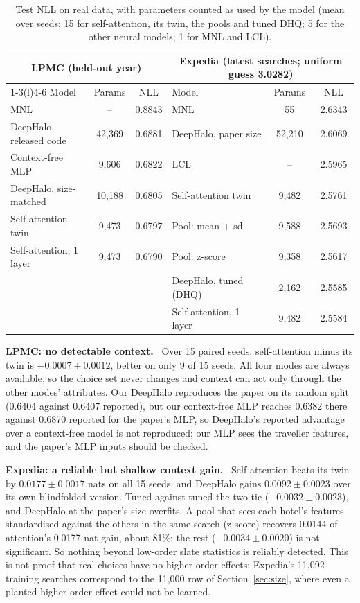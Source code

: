 \documentclass[11pt,a4paper]{article}
\numberwithin{table}{section}
\numberwithin{figure}{section}
\numberwithin{equation}{section}
\newcommand{\para}[1]{\textbf{#1}\ }
\begin{document}
\begin{table}[h]
\centering\small
\caption{Test NLL on real data, with parameters counted as used by the model (mean over seeds: 15 for self-attention, its twin, the pools and tuned DHQ; 5 for the other neural models; 1 for MNL and LCL).}\label{tab:real}
\begin{tabular}{@{}lcc@{\hspace{2em}}lcc@{}}
\toprule
\multicolumn{3}{c}{LPMC (held-out year)} & \multicolumn{3}{c}{Expedia (latest searches; uniform guess 3.0282)}\\
\cmidrule(r){1-3}\cmidrule(l){4-6}
Model & Params & NLL & Model & Params & NLL\\
\midrule
MNL & -- & 0.8843 & MNL & 55 & 2.6343\\
DeepHalo, released code & 42,369 & 0.6881 & DeepHalo, paper size & 52,210 & 2.6069\\
Context-free MLP & 9,606 & 0.6822 & LCL & -- & 2.5965\\
DeepHalo, size-matched & 10,188 & 0.6805 & Self-attention twin & 9,482 & 2.5761\\
Self-attention twin & 9,473 & 0.6797 & Pool: mean + sd & 9,588 & 2.5693\\
Self-attention, 1 layer & 9,473 & 0.6790 & Pool: z-score & 9,358 & 2.5617\\
& & & DeepHalo, tuned (DHQ) & 2,162 & 2.5585\\
& & & Self-attention, 1 layer & 9,482 & 2.5584\\
\bottomrule
\end{tabular}
\end{table}

\para{LPMC: no detectable context.} Over 15 paired seeds, self-attention minus its twin is $-0.0007\pm0.0012$, better on only 9 of 15 seeds. All four modes are always available, so the choice set never changes and context can act only through the other modes' attributes. Our DeepHalo reproduces the paper on its random split (0.6404 against 0.6407 reported), but our context-free MLP reaches 0.6382 there against 0.6870 reported for the paper's MLP, so DeepHalo's reported advantage over a context-free model is not reproduced; our MLP sees the traveller features, and the paper's MLP inputs should be checked.

\para{Expedia: a reliable but shallow context gain.} Self-attention beats its twin by $0.0177\pm0.0017$ nats on all 15 seeds, and DeepHalo gains $0.0092\pm0.0023$ over its own blindfolded version. Tuned against tuned the two tie ($-0.0032\pm0.0023$), and DeepHalo at the paper's size overfits. A pool that sees each hotel's features standardised against the others in the same search (z-score) recovers 0.0144 of attention's 0.0177-nat gain, about 81\%; the rest ($-0.0034\pm0.0020$) is not significant. So nothing beyond low-order slate statistics is reliably detected. This is not proof that real choices have no higher-order effects: Expedia's 11,092 training searches correspond to the 11,000 row of Section~\ref{sec:size}, where even a planted higher-order effect could not be learned.
\end{document}
